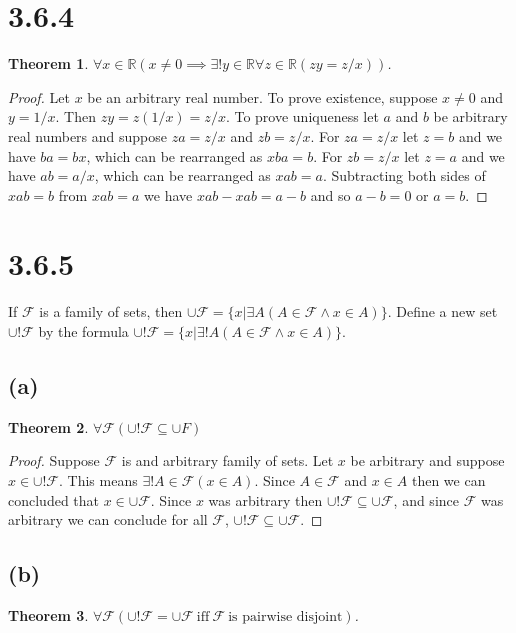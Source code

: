 \documentclass{article}
\newcommand{\F}{\mathcal{F}}
\newtheorem*{theorem}{Theorem}  %
\begin{document}
\section*{3.6.4}
\begin{theorem} $\forall x \in \mathbb{R} ( x \neq 0 \implies \exists! y \in \mathbb{R} \forall z \in \mathbb{R} (zy = z/x))$.
\end{theorem}

\begin{proof}
Let $x$ be an arbitrary real number. To prove existence, suppose $x \neq 0$ and $y = 1/x$. Then $zy = z(1/x) = z/x$. To prove uniqueness let $a$ and $b$ be arbitrary real numbers and suppose $za = z/x$ and $zb = z/x$. For $za = z/x$ let $z = b$ and we have $ba = bx$, which can be rearranged as $xba = b$. For $zb = z/x$ let $z = a$ and we have $ab = a/x$, which can be rearranged as $xab = a$. Subtracting both sides of $xab = b$ from $xab = a$ we have $xab - xab = a - b$ and so $a - b = 0$ or $a = b$.
\end{proof}

\section*{3.6.5}
If $\F$ is a family of sets, then $\cup \F = \{x | \exists A(A \in \F \land x \in A) \}$. Define a new set $\cup!\F$ by the formula $\cup ! \F = \{x | \exists! A (A \in \F \land x \in A )\}$.

\subsection*{(a)}
\begin{theorem} $\forall \F (\cup ! \F \subseteq \cup F)$
\end{theorem}
\begin{proof}
Suppose $\F$ is and arbitrary family of sets. Let $x$ be arbitrary and suppose $x \in \cup! \F$. This means $\exists! A \in \F (x \in A)$. Since $A \in \F$ and $x \in A$ then we can concluded that $x \in \cup \F$. Since $x$ was arbitrary then $\cup ! \F \subseteq \cup \F$, and since $\F$ was arbitrary we can conclude for all $\F$, $\cup ! \F \subseteq \cup \F$.
\end{proof}

\subsection*{(b)}
\begin{theorem} $\forall \F (\cup! \F = \cup \F ~\text{iff}~ \F ~ \text{is pairwise disjoint})$. 
\end{theorem}
\end{document}

